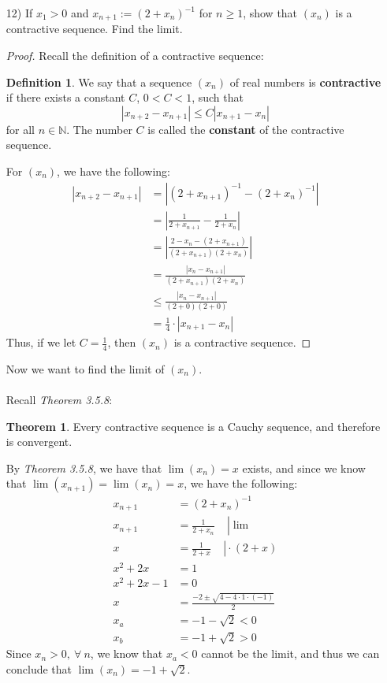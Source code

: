 \documentclass[12pt,letterpaper]{article}
\newcommand{\abs}[1]{\left\lvert #1 \right\rvert}
\newcommand{\N}{\mathbb{N}}
\theoremstyle{case}
\theoremstyle{definition}
\newtheorem*{definition*}{Definition}
\newtheorem*{theorem*}{Theorem}
\begin{document}
\begin{enumerate}
\begin{enumerate}
			\item[12)] If $x_1>0$ and $x_{n+1}:=(2+x_n)^{-1}$ for $n \geq 1$, show that $(x_n)$ is a contractive sequence. Find the limit.
			\begin{proof}
				Recall the definition of a contractive sequence:
				\theoremstyle{definition}
				\begin{definition*}
					We say that a sequence $(x_n)$ of real numbers is \textbf{contractive} if there exists a constant $C$, $0<C<1$, such that
					\[|x_{n+2}-x_{n+1}| \leq C|x_{n+1}-x_n|\]
					for all $n \in \N$. The number $C$ is called the \textbf{constant} of the contractive sequence.
				\end{definition*}
				For $(x_n)$, we have the following:
				\begin{align*}
					|x_{n+2}-x_{n+1}| &= |(2+x_{n+1})^{-1}-(2+x_n)^{-1}| \\
					&= \abs{\frac{1}{2+x_{n+1}}-\frac{1}{2+x_n}} \\
					&= \abs{\frac{2-x_n-(2+x_{n+1})}{(2+x_{n+1})(2+x_n)}} \\
					&= \frac{|x_n-x_{n+1}|}{(2+x_{n+1})(2+x_n)} \\
					&\leq \frac{|x_n-x_{n+1}|}{(2+0)(2+0)} \\
					&= \frac{1}{4} \cdot |x_{n+1}-x_n|
				\end{align*}
				Thus, if we let $C=\frac{1}{4}$, then $(x_n)$ is a contractive sequence.
			\end{proof}
			Now we want to find the limit of $(x_n)$.
			\\\\Recall \textit{Theorem 3.5.8}:
			\begin{theorem*}
				Every contractive sequence is a Cauchy sequence, and therefore is convergent.
			\end{theorem*}
			By \textit{Theorem 3.5.8}, we have that $\lim (x_n)=x$ exists, and since we know that $\lim (x_{n+1})=\lim (x_n)=x$, we have the following:
			\begin{align*}
				x_{n+1} &= (2+x_n)^{-1} \\
				x_{n+1} &= \left.\frac{1}{2+x_n}\ \ \ \ \ \right| \lim \\
				x &= \frac{1}{2+x}\ \ \ \ \ \left.\right| \cdot (2+x) \\
				x^2+2x &=1 \\
				x^2+2x-1 &= 0 \\
				x &= \frac{-2 \pm \sqrt{4-4 \cdot 1 \cdot (-1)}}{2} \\
				x_a &= -1-\sqrt{2} < 0 \\
				x_b &= -1 + \sqrt{2}>0
			\end{align*}
			Since $x_n>0,\ \forall\ n$, we know that $x_a<0$ cannot be the limit, and thus we can conclude that $\lim (x_n)=-1+\sqrt{2}$.\\
			

\end{enumerate}
\end{enumerate}
\end{document}
